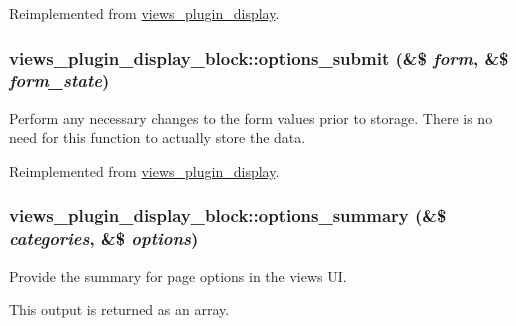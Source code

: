 Reimplemented from \hyperlink{classviews__plugin__display_ad9c69d91ea1165ff51dcd1f1f6d3a154}{views\_\-plugin\_\-display}.\hypertarget{classviews__plugin__display__block_aaac31f678cc192896bcfdeb1a8a5a2c7}{
\subsubsection[{options\_\-submit}]{\setlength{\rightskip}{0pt plus 5cm}views\_\-plugin\_\-display\_\-block::options\_\-submit (\&\$ {\em form}, \/  \&\$ {\em form\_\-state})}}
\label{classviews__plugin__display__block_aaac31f678cc192896bcfdeb1a8a5a2c7}
Perform any necessary changes to the form values prior to storage. There is no need for this function to actually store the data. 

Reimplemented from \hyperlink{classviews__plugin__display_a75f0b2d5587b365640fcb4d414daae36}{views\_\-plugin\_\-display}.\hypertarget{classviews__plugin__display__block_a52bb2499272275963128bb2beb5804ce}{
\subsubsection[{options\_\-summary}]{\setlength{\rightskip}{0pt plus 5cm}views\_\-plugin\_\-display\_\-block::options\_\-summary (\&\$ {\em categories}, \/  \&\$ {\em options})}}
\label{classviews__plugin__display__block_a52bb2499272275963128bb2beb5804ce}
Provide the summary for page options in the views UI.

This output is returned as an array. 

